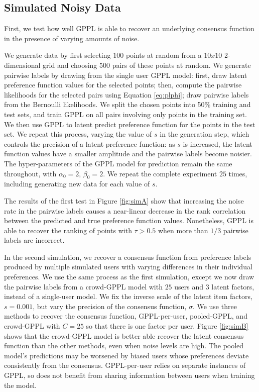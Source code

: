 \subsection{Simulated Noisy Data}\label{sec:exp_synth}

First, we test how well GPPL is able to recover an underlying consensus function
in the presence of varying amounts of noise.

We generate data by first selecting $100$ points at random
from a $10x10$ 2-dimensional grid and choosing $500$ pairs of these points at random. 
We generate pairwise labels by drawing from the single user GPPL model:
first, draw latent preference function values for the selected points; 
then, compute the pairwise likelihoods for the selected pairs using Equation \ref{eq:plphi};
draw pairwise labels from the Bernoulli likelihoods. 
We split the chosen points into 50\% training and test sets, and
train GPPL on all pairs involving only points in the training set.
We then use GPPL to latent predict preference function for the points in the test set.
We repeat this process, varying the value of $s$ in the generation step, 
which controls the precision of a latent preference function: as $s$ is increased, the latent
function values have a smaller amplitude and the pairwise labels become noisier.
The hyper-parameters of the GPPL model for prediction remain the same throughout, 
with $\alpha_0 = 2$, $\beta_0 = 2$.
We repeat the complete experiment $25$ times, including generating new data for each value of $s$.

The results of the first test in Figure \ref{fig:simA} show that increasing
the noise rate in the pairwise labels causes a near-linear decrease in the
rank correlation between the predicted and true preference function values. 
Nonetheless, GPPL is able to recover the ranking of points with $\tau > 0.5$ when
more than $1/3$ pairwise labels are incorrect.

In the second simulation, we recover a consensus function
from preference labels produced by multiple simulated users with varying differences
in their individual preferences. We use the same process as the first simulation, except
we now draw the pairwise labels from a crowd-GPPL model with $25$ users and $3$ latent factors,
instead of a single-user model. We fix the inverse scale of the latent item factors, $s=0.001$,
but vary the precision of the consensus function, $\sigma$. 
We use three methods to recover the consensus function, GPPL-per-user, pooled-GPPL, 
and crowd-GPPL with $C=25$ so that there is one factor per user. 
Figure \ref{fig:simB} shows that the crowd-GPPL model is better able recover the latent consensus
function than the other methods, even when noise levels are high. 
The pooled model's predictions may be worsened by biased users whose preferences deviate
 consistently from the consensus. GPPL-per-user relies on separate instances of GPPL, so 
 does not benefit from sharing information between users when training the model.

